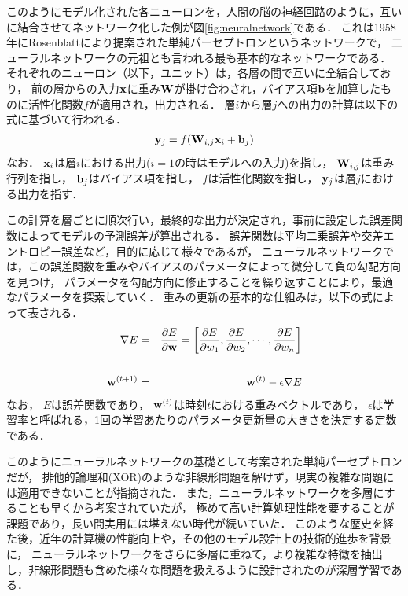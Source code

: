 このようにモデル化された各ニューロンを，人間の脳の神経回路のように，互いに結合させてネットワーク化した例が図\ref{fig:neuralnetwork}である．
これは1958年にRosenblattにより提案された単純パーセプトロンというネットワークで，
二ューラルネットワークの元祖とも言われる最も基本的なネットワークである\cite{rosenblatt1958perceptron}．
それぞれのニューロン（以下，ユニット）は，各層の間で互いに全結合しており，
前の層からの入力${\bf x}$に重み${\bf W}$が掛け合わされ，バイアス項${\bf b}$を加算したものに活性化関数$f$が適用され，出力される．
層$i$から層$j$への出力の計算は以下の式に基づいて行われる．
\begin{eqnarray}
{\bf y}_j =  f({\bf W}_{i,j} {\bf x}_i + {\bf b}_j)
\end{eqnarray}
なお．
${\bf x}_i$は層$i$における出力($i=1$の時はモデルへの入力)を指し，
${\bf W}_{i,j}$は重み行列を指し，
${\bf b}_j$はバイアス項を指し，
$f$は活性化関数を指し，
${\bf y}_j$は層$j$における出力を指す．

この計算を層ごとに順次行い，最終的な出力が決定され，事前に設定した誤差関数によってモデルの予測誤差が算出される．
誤差関数は平均二乗誤差や交差エントロピー誤差など，目的に応じて様々であるが，
ニューラルネットワークでは，この誤差関数を重みやバイアスのパラメータによって微分して負の勾配方向を見つけ，
パラメータを勾配方向に修正することを繰り返すことにより，最適なパラメータを探索していく．
重みの更新の基本的な仕組みは，以下の式によって表される．
\begin{eqnarray}
\nabla E &=& \frac{\partial E}{\partial {\bf w}}
 = \biggl[\frac{\partial E}{\partial w_1}, \frac{\partial E}{\partial w_2}, \cdots, \frac{\partial E}{\partial w_n}\biggr] \\
\\
{\bf w}^{(t+1)} &=& {\bf w}^{(t)} - \epsilon \nabla E
\end{eqnarray}
なお，
$E$は誤差関数であり，
${\bf w}^{(t)}$は時刻$t$における重みベクトルであり，
$\epsilon$は学習率と呼ばれる，1回の学習あたりのパラメータ更新量の大きさを決定する定数である．

このようにニューラルネットワークの基礎として考案された単純パーセプトロンだが，
排他的論理和(XOR)のような非線形問題を解けず，現実の複雑な問題には適用できないことが指摘された\cite{minsky1969perceptron}．
また，ニューラルネットワークを多層にすることも早くから考案されていたが，
極めて高い計算処理性能を要することが課題であり，長い間実用には堪えない時代が続いていた．
このような歴史を経た後，近年の計算機の性能向上や，その他のモデル設計上の技術的進歩を背景に，
ニューラルネットワークをさらに多層に重ねて，より複雑な特徴を抽出し，非線形問題も含めた様々な問題を扱えるように設計されたのが深層学習である．


